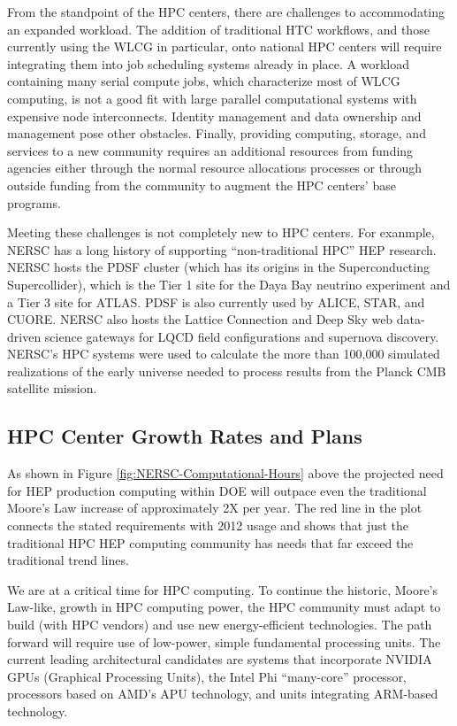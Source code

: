 From the standpoint of the HPC centers, there are challenges to accommodating an expanded workload. The addition of traditional HTC workflows, and those currently using the WLCG in particular, onto 
national HPC centers will require integrating them into job scheduling systems already in place. 
A workload containing many serial compute jobs, which characterize most of WLCG computing, 
is not a good fit with large parallel computational systems with expensive node interconnects. 
Identity management and data ownership and management pose other obstacles. Finally, providing 
computing, storage, and services to a new community requires an additional resources from 
funding agencies either through the normal resource allocations processes or through outside 
funding from the community to augment the HPC centers' base programs.
 
Meeting these challenges is not completely new to HPC centers. For exanmple,
NERSC has a long history of supporting ``non-traditional HPC'' HEP research.  
NERSC hosts the PDSF cluster (which has its origins in the Superconducting Supercollider), 
which is the Tier 1 site for the Daya Bay neutrino experiment and 
a Tier 3 site for ATLAS. PDSF is also currently used by ALICE, STAR, and CUORE. 
 NERSC also hosts the Lattice Connection and Deep Sky web data-driven science gateways for 
LQCD field configurations  and supernova discovery. 
NERSC's HPC systems were used to calculate the more than 100,000 simulated realizations of the 
early universe needed to process results from the Planck CMB satellite mission. 


\subsection{HPC Center Growth Rates and Plans}
 
As shown in Figure \ref{fig:NERSC-Computational-Hours} above the projected need for HEP production computing within DOE will outpace even the traditional Moore's Law increase of approximately 2X per year.  The red line in the plot connects the stated requirements with 2012 usage and shows that just the traditional HPC HEP computing community has needs that far exceed the traditional trend lines. 
 
We are at a critical time for HPC computing. To continue the historic, Moore's Law-like, growth in HPC computing power, the HPC community must adapt to build (with HPC vendors) and use new energy-efficient technologies. The path forward will require use of low-power, simple fundamental processing units. The current leading architectural candidates are systems that incorporate NVIDIA GPUs (Graphical Processing Units), the Intel Phi ``many-core'' processor, processors based on AMD's APU technology, and units integrating ARM-based technology.

